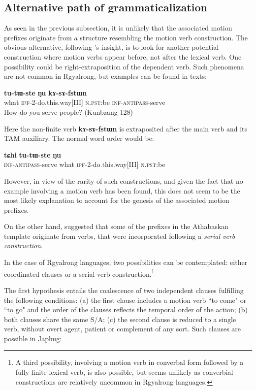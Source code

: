 \documentclass[oldfontcommands,twoside,a4paper,12pt]{article}
\newcommand{\ipa}[1]{{\phon\textbf{#1}}}
\begin{document}
\subsection{Alternative path of grammaticalization} \label{subsec:grammat}
As seen in the previous subsection, it is unlikely that the associated motion prefixes originate from a structure resembling the motion verb construction. The obvious alternative, following \citet{comrie80morpho}'s insight, is to look for another potential construction where motion verbs appear before, not after the lexical verb. One possibility could be right-extraposition of the dependent verb. Such phenomena are not common in Rgyalrong, but examples can be found in texts:
\begin{exe}
\ex  
\gll\ipa{tɕhi}   	\ipa{tu-tɯ-ste}   	\ipa{ŋu}   	\ipa{kɤ-sɤ-fstɯn}    \\
what \textsc{ipf}-2-do.this.way[III] \textsc{n.pst}:be \textsc{inf}-\textsc{antipass}-serve \\
\glt How do you serve people? (Kunbzang 128)
\end{exe} 
Here the non-finite  verb \ipa{kɤ-sɤ-fstɯn} is extraposited after the main verb and its TAM auxiliary. The normal word order would be:
\begin{exe}
\ex  
\gll \ipa{kɤ-sɤ-fstɯn}   	\ipa{tɕhi}   	\ipa{tu-tɯ-ste}   	\ipa{ŋu}   	 \\
\textsc{inf}-\textsc{antipass}-serve what \textsc{ipf}-2-do.this.way[III] \textsc{n.pst}:be  \\
\end{exe} 
 
 However, in view of the rarity of such constructions, and given the fact that no example involving a motion verb has been found, this does not seem to be the most likely explanation to account for the genesis of the associated motion prefixes.

On the other hand, \citet[141]{givon2000internal} suggested that some of the prefixes in the Athabaskan template originate from verbs, that were incorporated following a \textit{serial verb construction}. 

In the case of Rgyalrong languages, two possibilities can be contemplated: either coordinated clauses or a serial verb construction.\footnote{A third possibility, involving a motion verb in converbal form followed by a fully finite lexical verb, is also possible, but seems unlikely as converbial constructions are relatively uncommon in Rgyalrong languages. }

	The first hypothesis entails the coalescence of two independent clauses fulfilling the following conditions: (a) the first clause includes a motion verb ``to come" or ``to go" and the order of the clauses reflects the temporal order of the action; (b) both clauses share the same S/A; (c) the second clause is reduced to a single verb, without overt agent, patient or complement of any sort.  Such clauses are possible in Japhug:
\end{document}
